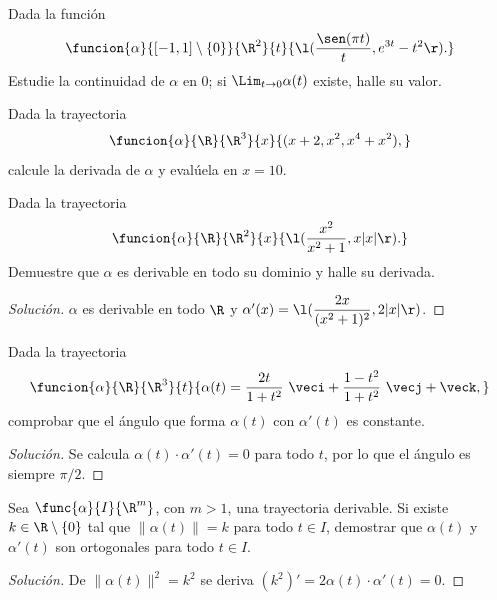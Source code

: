 \documentclass[a4,11pt]{aleph-notas}
\begin{document}
\begin{ejer}
    Dada la función
    \[
        \funcion{\alpha}{[-1,1]\setminus\{0\}}{\R^2}{t}{\l(\dfrac{\sen(\pi t)}t,e^{3t}-t^2\r).}
    \]
    Estudie la continuidad de $\alpha$ en $0$; si $\Lim_{t\to 0} \alpha(t)$ existe, halle su valor.
\end{ejer}
\begin{ejer}
    Dada la trayectoria
    \[
        \funcion{\alpha}{\R}{\R^3}{x}{(x+2,x^2,x^4+x^2),}
    \]
    calcule la derivada de $\alpha$ y evalúela en $x=10$.
\end{ejer}
\begin{ejer}
    Dada la trayectoria
    \[
        \funcion{\alpha}{\R}{\R^2}{x}{\l(\dfrac{x^2}{x^2+1},x|x|\r).}
    \]
    Demuestre que $\alpha$ es derivable en todo su dominio y halle su derivada.
\end{ejer}

\begin{proof}[Solución]
    $\alpha$ es derivable en todo $\R$ y $\alpha'(x)=\l(\dfrac{2x}{(x^2+1)^2},2|x|\r)$.
\end{proof}

\begin{ejer}
    Dada la trayectoria
    \[
        \funcion{\alpha}{\R}{\R^3}{t}{\alpha(t)=
            \frac{2t}{1+t^2}\ \veci+\frac{1-t^2}{1+t^2}\ \vecj+\veck,
        }
    \]
    comprobar que el ángulo que forma $\alpha(t)$ con $\alpha'(t)$ es constante.
\end{ejer}

\begin{proof}[Solución]
    Se calcula $\alpha(t)\cdot\alpha'(t)=0$ para todo $t$, por lo que el ángulo es siempre $\pi/2$.
\end{proof}

\begin{ejer}
    Sea $\func{\alpha}{I}{\R^m}$, con $m>1$, una trayectoria derivable. Si existe $k\in\R\setminus\{0\}$ tal que $\| \alpha(t) \|=k$ para todo $t\in I$, demostrar que $\alpha(t)$ y $\alpha'(t)$ son ortogonales para todo $t\in I$.
\end{ejer}

\begin{proof}[Solución]
    De $\|\alpha(t)\|^2=k^2$ se deriva $(k^2)'=2\alpha(t)\cdot\alpha'(t)=0$.
\end{proof}
\end{document}
